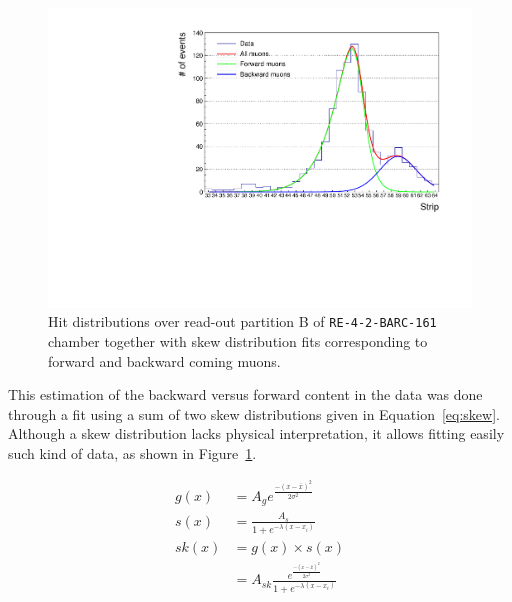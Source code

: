 	\begin{figure}
            \centering
		\includegraphics[width = \linewidth]{fig/chapt5/Cosmic-data-21-skew-fit.pdf}
		\caption{\label{fig:Fit-data} Hit distributions over read-out partition B of \texttt{RE-4-2-BARC-161} chamber together with skew distribution fits corresponding to forward and backward coming muons.}
	\end{figure}
	
	This estimation of the backward versus forward content in the data was done through a fit using a sum of two skew distributions given in Equation~\ref{eq:skew}. Although a skew distribution lacks physical interpretation, it allows fitting easily such kind of data, as shown in Figure~\ref{fig:Fit-data}.
	
	\begin{equation}
	\label{eq:skew}
		\begin{aligned}
	g(x) &= A_g e^{\frac{-(x-\bar{x})^2}{2\sigma^2}}\\
	s(x) &= \frac{A_s}{1+e^{-\lambda(x-x_i)}}\\
	sk(x) &= g(x)\times s(x)\\
	      &= A_{sk}\frac{e^{\frac{-(x-\bar{x})^2}{2\sigma^2}}}{1+e^{-\lambda(x-x_i)}}
		\end{aligned}
	\end{equation}

\endgroup
	
